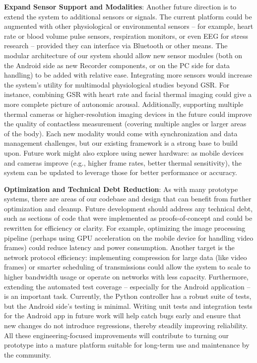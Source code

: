 \textbf{Expand Sensor Support and Modalities}: Another future direction is to extend the system to additional sensors or signals. The current platform could be augmented with other physiological or environmental sensors -- for example, heart rate or blood volume pulse sensors, respiration monitors, or even EEG for stress research -- provided they can interface via Bluetooth or other means. The modular architecture of our system should allow new sensor modules (both on the Android side as new Recorder components, or on the PC side for data handling) to be added with relative ease. Integrating more sensors would increase the system's utility for multimodal physiological studies beyond GSR. For instance, combining GSR with heart rate and facial thermal imaging could give a more complete picture of autonomic arousal. Additionally, supporting multiple thermal cameras or higher-resolution imaging devices in the future could improve the quality of contactless measurement (covering multiple angles or larger areas of the body). Each new modality would come with synchronization and data management challenges, but our existing framework is a strong base to build upon. Future work might also explore using newer hardware: as mobile devices and cameras improve (e.g., higher frame rates, better thermal sensitivity), the system can be updated to leverage those for better performance or accuracy.

\textbf{Optimization and Technical Debt Reduction}: As with many prototype systems, there are areas of our codebase and design that can benefit from further optimization and cleanup. Future development should address any technical debt, such as sections of code that were implemented as proofs-of-concept and could be rewritten for efficiency or clarity. For example, optimizing the image processing pipeline (perhaps using GPU acceleration on the mobile device for handling video frames) could reduce latency and power consumption. Another target is the network protocol efficiency: implementing compression for large data (like video frames) or smarter scheduling of transmissions could allow the system to scale to higher bandwidth usage or operate on networks with less capacity. Furthermore, extending the automated test coverage -- especially for the Android application -- is an important task. Currently, the Python controller has a robust suite of tests, but the Android side's testing is minimal. Writing unit tests and integration tests for the Android app in future work will help catch bugs early and ensure that new changes do not introduce regressions, thereby steadily improving reliability. All these engineering-focused improvements will contribute to turning our prototype into a mature platform suitable for long-term use and maintenance by the community.

